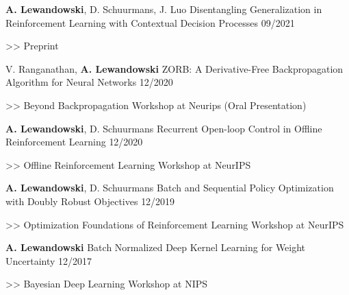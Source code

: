 \begin{cventries}
    \cventry
    {\textbf{A. Lewandowski}, D. Schuurmans, J. Luo}
    {Disentangling Generalization in Reinforcement Learning with Contextual
      Decision Processes}
    {09/2021}
    {
      \begin{cvitems}
    	\item[>>] Preprint
      \end{cvitems}
    }

    \cventry
    {V. Ranganathan, \textbf{A. Lewandowski}}
    {ZORB: A Derivative-Free Backpropagation Algorithm for Neural Networks}
    {12/2020}
    {
      \begin{cvitems}
    	\item[>>] Beyond Backpropagation Workshop at Neurips (Oral
      Presentation)
      \end{cvitems}
    }

    \cventry
    { \textbf{A. Lewandowski}, D. Schuurmans}
    {Recurrent Open-loop Control in Offline Reinforcement Learning}
    {12/2020}
    {
      \begin{cvitems}
    	\item[>>] Offline Reinforcement Learning Workshop at NeurIPS
      \end{cvitems}
    }


    \cventry
    { \textbf{A. Lewandowski}, D. Schuurmans}
    {Batch and Sequential Policy Optimization with Doubly Robust Objectives}
    {12/2019}
    {
      \begin{cvitems}
    	\item[>>] Optimization Foundations of Reinforcement Learning Workshop at NeurIPS
      \end{cvitems}
    }


  \cventry
    {\textbf{A. Lewandowski}}
    {Batch Normalized Deep Kernel Learning for Weight Uncertainty}
    {12/2017}
    {
      \begin{cvitems}
    	\item[>>] Bayesian Deep Learning Workshop at NIPS
      \end{cvitems}
    }
  \end{cventries}

